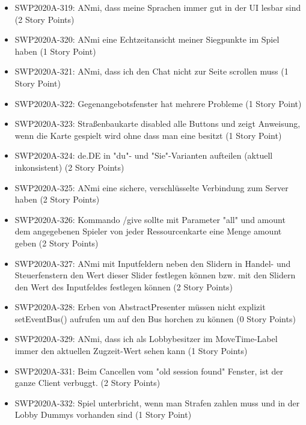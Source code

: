 \documentclass[12pt,a4paper, oneside]{article}
\begin{document}
\begin{itemize}
        \item SWP2020A-319: ANmi, dass meine Sprachen immer gut in der UI lesbar sind (2 Story Points)

        \item SWP2020A-320: ANmi eine Echtzeitansicht meiner Siegpunkte im Spiel haben (1 Story Point)

        \item SWP2020A-321: ANmi, dass ich den Chat nicht zur Seite scrollen muss (1 Story Point)

        \item SWP2020A-322: Gegenangebotsfenster hat mehrere Probleme (1 Story Point)

        \item SWP2020A-323: Straßenbaukarte disabled alle Buttons und zeigt Anweisung, wenn die Karte gespielt wird ohne dass man eine besitzt (1 Story Point)

        \item SWP2020A-324: de.DE in "du"- und "Sie"-Varianten aufteilen (aktuell inkonsistent) (2 Story Points)

        \item SWP2020A-325: ANmi eine sichere, verschlüsselte Verbindung zum Server haben (2 Story Points)

        \item SWP2020A-326: Kommando /give sollte mit Parameter "all" und amount dem angegebenen Spieler von jeder Ressourcenkarte eine Menge amount geben (2 Story Points)

        \item SWP2020A-327: ANmi mit Inputfeldern neben den Slidern in Handel- und Steuerfenstern den Wert dieser Slider festlegen können bzw. mit den Slidern den Wert des Inputfeldes festlegen können (2 Story Points)

        \item SWP2020A-328: Erben von AbstractPresenter müssen nicht explizit setEventBus() aufrufen um auf den Bus horchen zu können (0 Story Points)

        \item SWP2020A-329: ANmi, dass ich als Lobbybesitzer im MoveTime-Label immer den aktuellen Zugzeit-Wert sehen kann (1 Story Points)

        \item SWP2020A-331: Beim Cancellen vom "old session found" Fenster, ist der ganze Client verbuggt. (2 Story Points)

        \item SWP2020A-332: Spiel unterbricht, wenn man Strafen zahlen muss und in der Lobby Dummys vorhanden sind (1 Story Point)


\end{itemize}
\end{document}
